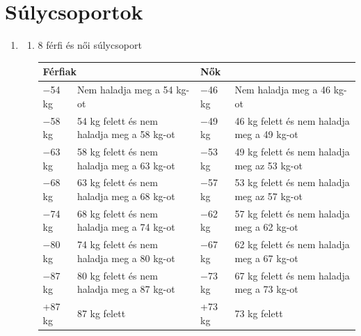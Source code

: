 \documentclass[]{report}
\begin{document}


\chapter{Súlycsoportok}

\begin{enumerate}

\item


  \begin{enumerate}
  \item 8 férfi és női súlycsoport
    \begin{center}
    \begin{tabular}{ |l|l|l|l| }
     \hline
     \multicolumn{2}{|l|}{Férfiak} & \multicolumn{2}{l|}{Nők} \\
     \hline
     $-$54 kg & Nem haladja meg a 54 kg-ot & $-$46 kg & Nem haladja meg a 46 kg-ot \\
     \hline
     $-$58 kg & 54 kg felett és nem haladja meg a 58 kg-ot & $-$49 kg & 46 kg felett és nem haladja meg a 49 kg-ot \\
     \hline
     $-$63 kg & 58 kg felett és nem haladja meg a 63 kg-ot & $-$53 kg & 49 kg felett és nem haladja meg az 53 kg-ot \\
     \hline
     $-$68 kg & 63 kg felett és nem haladja meg a 68 kg-ot & $-$57 kg & 53 kg felett és nem haladja meg az 57 kg-ot \\
     \hline
     $-$74 kg & 68 kg felett és nem haladja meg a 74 kg-ot & $-$62 kg & 57 kg felett és nem haladja meg a 62 kg-ot \\
     \hline
     $-$80 kg & 74 kg felett és nem haladja meg a 80 kg-ot & $-$67 kg & 62 kg felett és nem haladja meg a 67 kg-ot \\
     \hline
     $-$87 kg & 80 kg felett és nem haladja meg a 87 kg-ot & $-$73 kg & 67 kg felett és nem haladja meg a 73 kg-ot \\
     \hline
     +87 kg & 87 kg felett & +73 kg & 73 kg felett \\
     \hline
    \end{tabular}
    \end{center}
    

\end{enumerate}
\end{enumerate}
\end{document}
